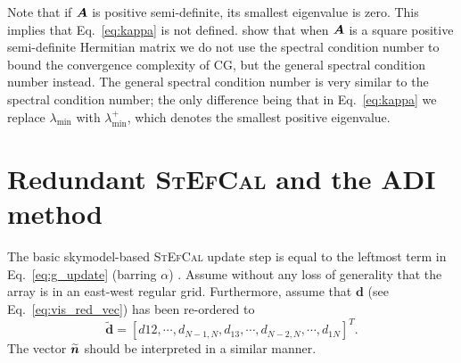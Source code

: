 \documentclass[useAMS,usenatbib]{mn2e}
\newcommand{\bA}{\bmath{A}}
\newcommand{\bn}{\bmath{n}}
\begin{document}
Note that if $\bA$ is positive semi-definite, its smallest eigenvalue is zero. This implies that Eq.~\eqref{eq:kappa} is not defined. \citet{Lu2015} show that when $\bA$
is a square positive semi-definite Hermitian matrix we do not use the spectral condition number to bound the convergence complexity of CG, but the general spectral condition
number instead. The general spectral condition number is very similar to the spectral condition number; the only difference being that in Eq.~\eqref{eq:kappa} we replace  
$\lambda_{\textrm{min}}$ with $\lambda_{\textrm{min}}^+$, which denotes the smallest positive eigenvalue.

\section{Redundant \textsc{StEfCal} and the ADI method}
\label{sec:red_stef_ADI}
The basic skymodel-based \textsc{StEfCal} update step is equal to  the leftmost term in Eq.~\eqref{eq:g_update} (barring $\alpha$) \citep{Salvini2014}.
Assume without any loss of generality that the array is in an east-west regular grid. Furthermore, assume that $\boldsymbol{d}$ (see Eq.~\eqref{eq:vis_red_vec}) has been re-ordered to
\begin{equation}
\widetilde{\boldsymbol{d}} = \left[d{12},\cdots,d_{N-1,N},d_{13},\cdots,d_{N-2,N},\cdots,d_{1N}\right]^T .
\end{equation}
The vector $\widetilde{\bn}$ should be interpreted in a similar manner.
\end{document}
